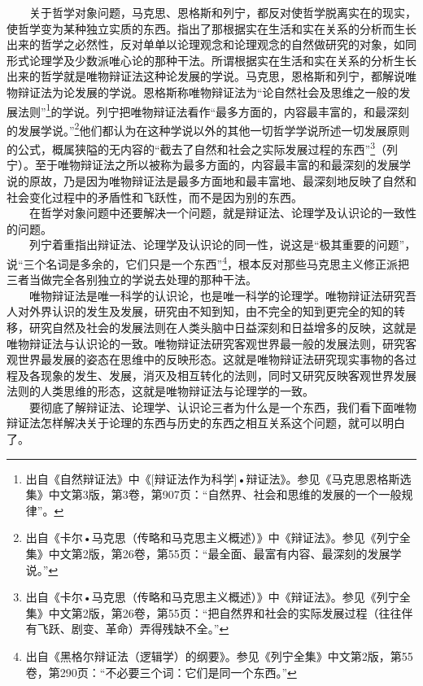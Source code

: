 \documentclass[cn,11pt,chinese]{elegantbook}
\begin{document}
　　关于哲学对象问题，马克思、恩格斯和列宁，都反对使哲学脱离实在的现实，使哲学变为某种独立实质的东西。指出了那根据实在生活和实在关系的分析而生长出来的哲学之必然性，反对单单以论理观念和论理观念的自然做研究的对象，如同形式论理学及少数派唯心论的那种干法。所谓根据实在生活和实在关系的分析生长出来的哲学就是唯物辩证法这种论发展的学说。马克思，恩格斯和列宁，都解说唯物辩证法为论发展的学说。恩格斯称唯物辩证法为“论自然社会及思维之一般的发展法则”\footnote[2]{ 出自《自然辩证法》中《[辩证法作为科学]•辩证法》。参见《马克思恩格斯选集》中文第3版，第3卷，第907页：“自然界、社会和思维的发展的一个一般规律”。}的学说。列宁把唯物辩证法看作“最多方面的，内容最丰富的，和最深刻的发展学说。”\footnote[3]{ 出自《卡尔•马克思（传略和马克思主义概述）》中《辩证法》。参见《列宁全集》中文第2版，第26卷，第55页：“最全面、最富有内容、最深刻的发展学说。”}他们都认为在这种学说以外的其他一切哲学学说所述一切发展原则的公式，概属狭隘的无内容的“截去了自然和社会之实际发展过程的东西”\footnote[4]{ 出自《卡尔•马克思（传略和马克思主义概述）》中《辩证法》。参见《列宁全集》中文第2版，第26卷，第55页：“把自然界和社会的实际发展过程（往往伴有飞跃、剧变、革命）弄得残缺不全。”}（列宁）。至于唯物辩证法之所以被称为最多方面的，内容最丰富的和最深刻的发展学说的原故，乃是因为唯物辩证法是最多方面地和最丰富地、最深刻地反映了自然和社会变化过程中的矛盾性和飞跃性，而不是因为别的东西。\\
　　在哲学对象问题中还要解决一个问题，就是辩证法、论理学及认识论的一致性的问题。\\
　　列宁着重指出辩证法、论理学及认识论的同一性，说这是“极其重要的问题”，说“三个名词是多余的，它们只是一个东西”\footnote[5]{ 出自《黑格尔辩证法（逻辑学）的纲要》。参见《列宁全集》中文第2版，第55卷，第290页：“不必要三个词：它们是同一个东西。”}，根本反对那些马克思主义修正派把三者当做完全各别独立的学说去处理的那种干法。\\
　　唯物辩证法是唯一科学的认识论，也是唯一科学的论理学。唯物辩证法研究吾人对外界认识的发生及发展，研究由不知到知，由不完全的知到更完全的知的转移，研究自然及社会的发展法则在人类头脑中日益深刻和日益增多的反映，这就是唯物辩证法与认识论的一致。唯物辩证法研究客观世界最一般的发展法则，研究客观世界最发展的姿态在思维中的反映形态。这就是唯物辩证法研究现实事物的各过程及各现象的发生、发展，消灭及相互转化的法则，同时又研究反映客观世界发展法则的人类思维的形态，这就是唯物辩证法与论理学的一致。\\
　　要彻底了解辩证法、论理学、认识论三者为什么是一个东西，我们看下面唯物辩证法怎样解决关于论理的东西与历史的东西之相互关系这个问题，就可以明白了。\\
\end{document}
